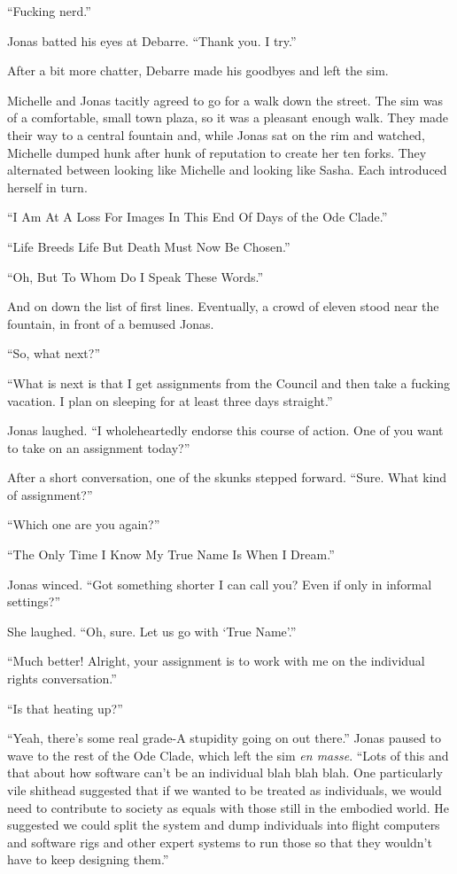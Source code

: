 ``Fucking nerd.''

Jonas batted his eyes at Debarre. ``Thank you. I try.''

After a bit more chatter, Debarre made his goodbyes and left the sim.

Michelle and Jonas tacitly agreed to go for a walk down the street. The sim was of a comfortable, small town plaza, so it was a pleasant enough walk. They made their way to a central fountain and, while Jonas sat on the rim and watched, Michelle dumped hunk after hunk of reputation to create her ten forks. They alternated between looking like Michelle and looking like Sasha. Each introduced herself in turn.

``I Am At A Loss For Images In This End Of Days of the Ode Clade.''

``Life Breeds Life But Death Must Now Be Chosen.''

``Oh, But To Whom Do I Speak These Words.''

And on down the list of first lines. Eventually, a crowd of eleven stood near the fountain, in front of a bemused Jonas.

``So, what next?''

``What is next is that I get assignments from the Council and then take a fucking vacation. I plan on sleeping for at least three days straight.''

Jonas laughed. ``I wholeheartedly endorse this course of action. One of you want to take on an assignment today?''

After a short conversation, one of the skunks stepped forward. ``Sure. What kind of assignment?''

``Which one are you again?''

``The Only Time I Know My True Name Is When I Dream.''

Jonas winced. ``Got something shorter I can call you? Even if only in informal settings?''

She laughed. ``Oh, sure. Let us go with `True Name'.''

``Much better! Alright, your assignment is to work with me on the individual rights conversation.''

``Is that heating up?''

``Yeah, there's some real grade-A stupidity going on out there.'' Jonas paused to wave to the rest of the Ode Clade, which left the sim \emph{en masse}. ``Lots of this and that about how software can't be an individual blah blah blah. One particularly vile shithead suggested that if we wanted to be treated as individuals, we would need to contribute to society as equals with those still in the embodied world. He suggested we could split the system and dump individuals into flight computers and software rigs and other expert systems to run those so that they wouldn't have to keep designing them.''

